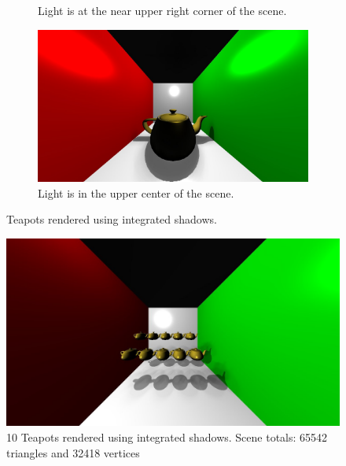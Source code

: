 \begin{figure}
\begin{subfigure}[b]{0.5\textwidth}
                \caption{Light is at the near upper right corner of the scene.}
        \end{subfigure}
        \begin{subfigure}[b]{0.5\textwidth}
                \includegraphics[width=\textwidth]{AltResults/teapotC.jpg}
                \caption{Light is in the upper center of the scene.}
        \end{subfigure}
        \caption{Teapots rendered using integrated shadows.}
\end{figure}


\begin{figure}[h!]
  \centering
    \includegraphics[width=1.0\textwidth]{AltResults/10teapots.jpg}
  \caption{10 Teapots rendered using integrated shadows. Scene totals: 65542 triangles and 32418 vertices}
	\label{fig:teapots}
\end{figure}

